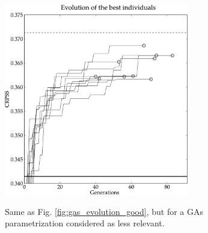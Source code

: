 \documentclass{ametsoc}
\begin{document}
\begin{figure}[t]
	\begin{center}
		\noindent\includegraphics[width=19pc,angle=0]{fig03.pdf}\\
	\end{center}
	\caption{Same as Fig. \ref{fig:gas_evolution_good}, but for a GAs parametrization considered as less relevant.}
	\label{fig:gas_evolution_bad}
\end{figure}
\end{document}
